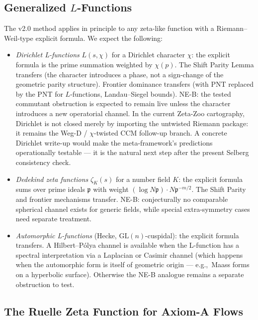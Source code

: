 \documentclass[12pt,a4paper]{article}
\theoremstyle{definition}
\theoremstyle{remark}
\begin{document}
\subsection{\texorpdfstring{Generalized $L$-Functions}{Generalized L-Functions}}

The v2.0 method applies in principle to any zeta-like function with a
Riemann--Weil-type explicit formula. We expect the following:

\begin{itemize}
\item \emph{Dirichlet L-functions} $L(s, \chi)$ for a Dirichlet character
$\chi$: the explicit formula is the prime summation weighted by $\chi(p)$.
The Shift Parity Lemma transfers (the character introduces a phase, not a
sign-change of the geometric parity structure). Frontier dominance transfers
(with PNT replaced by the PNT for $L$-functions, Landau--Siegel bounds).
NE-B: the tested commutant obstruction is expected to remain live unless the
character introduces a new operatorial channel. In the current Zeta-Zoo
cartography, Dirichlet is not closed merely by importing the untwisted Riemann
package: it remains the Weg-D / $\chi$-twisted CCM follow-up branch. A concrete
Dirichlet write-up would make the meta-framework's predictions operationally
testable --- it is the natural next step after the present Selberg consistency
check.

\item \emph{Dedekind zeta functions} $\zeta_K(s)$ for a number field $K$: the
explicit formula sums over prime ideals $\mathfrak{p}$ with weight
$(\log N\mathfrak{p}) \cdot N\mathfrak{p}^{-m/2}$. The Shift Parity and
frontier mechanisms transfer. NE-B: conjecturally no comparable spherical
channel exists for generic fields, while special extra-symmetry cases need
separate treatment.

\item \emph{Automorphic L-functions} (Hecke, $\mathrm{GL}(n)$-cuspidal):
the explicit formula transfers. A Hilbert--Pólya channel is available when
the L-function has a spectral interpretation via a Laplacian or Casimir
channel (which happens when the automorphic form is itself of geometric origin
--- e.g.,\ Maass forms on a hyperbolic surface). Otherwise the NE-B analogue
remains a separate obstruction to test.
\end{itemize}

\subsection{The Ruelle Zeta Function for Axiom-A Flows}
\end{document}
